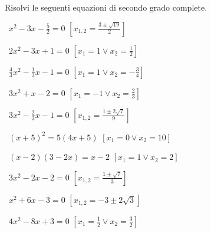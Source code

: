 \begin{esercizio}[\Ast]
 \label{ese:3.17}
Risolvi le seguenti equazioni di secondo grado complete.
\begin{multicols}{2}
 \begin{enumeratea}
 \item~$x^{2}-3 x-\frac{5}{2} = 0$
  \hfill$\left[x_{1,2} = \frac{3 \pm \sqrt{19}}{2}\right]$
 \item~$2 x^{2}-3 x + 1 = 0$
  \hfill$\left[x_{1} = 1 \vee x_{2} = \frac{1}{2}\right]$
 \item~$\frac{4}{3} x^{2}-\frac{1}{3} x-1 = 0$
  \hfill$\left[x_{1} = 1 \vee x_{2} =-\frac{3}{4}\right]$
 \item~$3 x^{2} + x-2 = 0$
  \hfill$\left[x_{1} =-1 \vee x_{2} = \frac{2}{3}\right]$
 \item~$3 x^{2}-\frac{2}{3} x-1 = 0$
  \hfill$\left[x_{1,2} = \frac{1 \pm 2 \sqrt{7}}{9}\right]$
 \item~$(x + 5)^{2} = 5 (4 x + 5)$
  \hfill$\left[x_{1} = 0 \vee x_{2} = 10\right]$
 \item~$(x-2) (3-2 x) = x-2$
  \hfill$\left[x_{1} = 1 \vee x_{2} = 2\right]$
 \item~$3 x^{2}-2 x-2 = 0$
  \hfill$\left[x_{1,2} = \frac{1 \pm \sqrt{7}}{3}\right]$
 \item~$x^{2} + 6 x-3 = 0$
  \hfill$\left[x_{1,2} =-3 \pm 2 \sqrt{3}\right]$
 \item~$4 x^{2}-8 x + 3 = 0$
  \hfill$\left[x_{1} = \frac{1}{2} \vee x_{2} = \frac{3}{2}\right]$
 \end{enumeratea}
 \end{multicols}
\end{esercizio}

